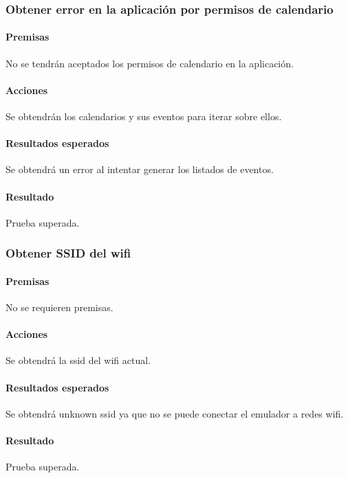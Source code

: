 \subsubsection{Obtener error en la aplicación por permisos de calendario}

\paragraph{Premisas}
No se tendrán aceptados los permisos de calendario en la aplicación.


\paragraph{Acciones}
Se obtendrán los calendarios y sus eventos para iterar sobre ellos.

\paragraph{Resultados esperados}
Se obtendrá un error al intentar generar los listados de eventos.

\paragraph{Resultado}
Prueba superada.

\subsubsection{Obtener SSID del wifi}

\paragraph{Premisas}
No se requieren premisas.

\paragraph{Acciones}
Se obtendrá la ssid del wifi actual.

\paragraph{Resultados esperados}
Se obtendrá unknown ssid ya que no se puede conectar el emulador a redes wifi.

\paragraph{Resultado}
Prueba superada.

